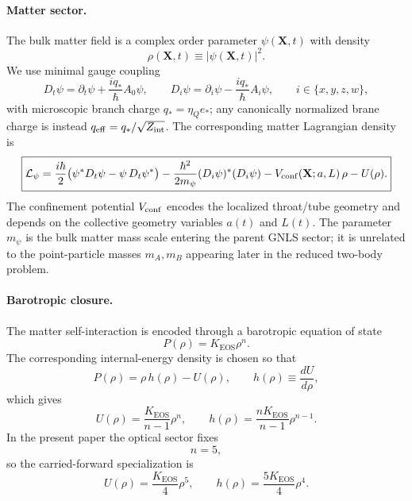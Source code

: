 \documentclass[11pt]{article}
\newcommand{\KEOS}{K_{\mathrm{EOS}}}
\newcommand{\etaQ}{\eta_Q}
\newcommand{\qstar}{q_*}
\newcommand{\estar}{e_*}
\newcommand{\qeff}{q_{\mathrm{eff}}}
\begin{document}
\paragraph{Matter sector.}
The bulk matter field is a complex order parameter \(\psi(\mathbf X,t)\) with density
\begin{equation}
\rho(\mathbf X,t)\equiv |\psi(\mathbf X,t)|^2.
\label{eq:app-density}
\end{equation}
We use minimal gauge coupling
\begin{equation}
D_t\psi = \partial_t\psi + \frac{i \qstar}{\hbar}A_0\psi,
\qquad
D_i\psi = \partial_i\psi - \frac{i \qstar}{\hbar}A_i\psi,
\qquad
i\in\{x,y,z,w\},
\label{eq:app-cov-derivs}
\end{equation}
with microscopic branch charge \(\qstar=\etaQ\estar\); any canonically normalized brane
charge is instead \(\qeff=\qstar/\sqrt{Z_{\rm int}}\).
The corresponding matter Lagrangian density is
\begin{equation}
\boxed{
\mathcal L_\psi
=
\frac{i\hbar}{2}\bigl(\psi^*D_t\psi-\psi\,D_t\psi^*\bigr)
-\frac{\hbar^2}{2m_\psi}(D_i\psi)^*(D_i\psi)
- V_{\rm conf}(\mathbf X;a,L)\,\rho
- U(\rho).
}
\label{eq:app-Lpsi}
\end{equation}
The confinement potential \(V_{\rm conf}\) encodes the localized throat/tube geometry and
depends on the collective geometry variables \(a(t)\) and \(L(t)\). The parameter
\(m_\psi\) is the bulk matter mass scale entering the parent GNLS sector; it is unrelated
to the point-particle masses \(m_A,m_B\) appearing later in the reduced two-body problem.

\paragraph{Barotropic closure.}
The matter self-interaction is encoded through a barotropic equation of state
\begin{equation}
P(\rho)=\KEOS \rho^n.
\label{eq:app-eos}
\end{equation}
The corresponding internal-energy density is chosen so that
\begin{equation}
P(\rho)=\rho\,h(\rho)-U(\rho),
\qquad
h(\rho)\equiv \frac{dU}{d\rho},
\label{eq:app-thermo-identity}
\end{equation}
which gives
\begin{equation}
U(\rho)=\frac{\KEOS}{n-1}\rho^n,
\qquad
h(\rho)=\frac{n\KEOS}{n-1}\rho^{n-1}.
\label{eq:app-U-h-general}
\end{equation}
In the present paper the optical sector fixes
\begin{equation}
n=5,
\end{equation}
so the carried-forward specialization is
\begin{equation}
U(\rho)=\frac{\KEOS}{4}\rho^5,
\qquad
h(\rho)=\frac{5\KEOS}{4}\rho^4.
\label{eq:app-U-h-n5}
\end{equation}
\end{document}
